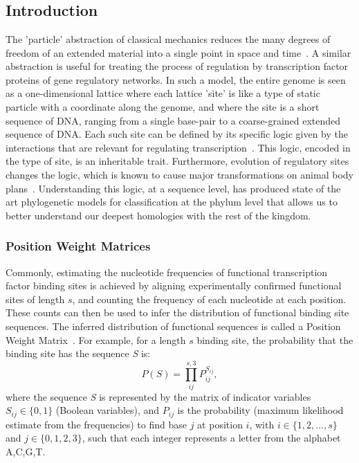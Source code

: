 
\newpage
\chapter{}

\section{Introduction}

The 'particle' abstraction of classical mechanics reduces the many degrees of freedom of an extended material into a single point in space and time~\cite{landaumech}.  A similar abstraction is useful for treating the process of regulation by transcription factor proteins of gene regulatory networks.  In such a model, the entire genome is seen as a one-dimensional lattice where each lattice 'site' is like a type of static particle with a coordinate along the genome, and where the site is a short sequence of DNA, ranging from a single base-pair to a coarse-grained extended sequence of DNA.  Each such site can be defined by its specific logic given by the interactions that are relevant for regulating transcription~\cite{pmid19104053,pmid9169833,pmid17903288}. This logic, encoded in the type of site, is an inheritable trait.  Furthermore, evolution of regulatory sites changes the logic, which is known to cause major transformations on animal body plans~\cite{pmid10892643,pmid12777501}.  Understanding this logic, at a sequence level, has produced state of the art phylogenetic models for classification at the phylum level that allows us to better understand our deepest homologies with the rest of the kingdom.

\subsection{Position Weight Matrices}
Commonly, estimating the nucleotide frequencies of functional transcription factor binding sites is achieved by aligning experimentally confirmed functional sites of length $s$, and counting the frequency of each nucleotide at each position.  These counts can then be used to infer the distribution of functional binding site sequences. The inferred distribution of functional sequences is called a Position Weight Matrix~\cite{pmid9581503}.  For example, for a length $s$ binding site, the probability that the binding site has the sequence \textit{S} is:
\begin{equation}\label{pwm1}
P(S) = \prod_{ij}^{s,3} P_{ij}^{S_{ij}},
\end{equation}
where the sequence \textit{S} is represented by the matrix of indicator variables $S_{ij} \in \{0,1\}$ (Boolean variables), and $P_{ij}$ is the probability (maximum likelihood estimate from the frequencies) to find base $j$ at position $i$, with $i \in \{1,2,\dots, s\}$ and $j\in \{0,1,2,3\}$, such that each integer represents a letter from the alphabet A,C,G,T.

